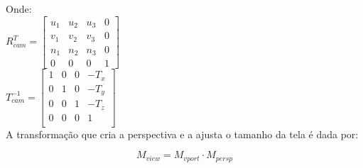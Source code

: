 \documentclass[12pt]{article}
\begin{document}
\noindent
Onde:
\\[\baselineskip]
$R_{cam}^T =
\begin{bmatrix}
    u_1 & u_2 & u_3 & 0   \\
    v_1 & v_2 & v_3 & 0   \\    
    n_1 & n_2 & n_3 & 0   \\
    0 & 0 & 0 & 1
\end{bmatrix}
$
\\[\baselineskip]
$T_{cam}^{-1} = 
\begin{bmatrix}
    1 & 0 & 0 & -T_{x} \\
    0 & 1 & 0 & -T_{y} \\
    0 & 0 & 1 & -T_{z} \\
    0 & 0 & 0 & 1 \\
\end{bmatrix}
$
\\[\baselineskip]
A transformação que cria a perspectiva e a ajusta o  tamanho da tela é dada por:

\boldmath{}
\[
M_{view} = M_{vport} \cdot M_{persp}    
\]
\unboldmath{}
\end{document}
